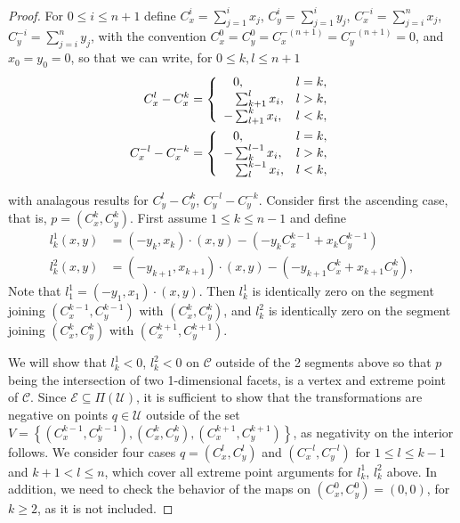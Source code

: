 \documentclass{article}
\theoremstyle{case}
\begin{document}
\begin{proof}
For $0 \leq i \leq n+1$ define $C_x^i = \sum_{j=1}^i x_j$, $C_y^i = \sum_{j=1}^i y_j$, $C_x^{-i} = \sum_{j=i}^n x_j$, $C_y^{-i} = \sum_{j=i}^n y_j$, with the convention $C_x^0 = C_y^0 = C_x^{-(n+1)} = C_y^{-(n+1)} = 0$, and $x_0 = y_0 = 0$, so that we can write, for $0  \leq k,l \leq n+1$
\begin{align*}
C_x^l - C_x^k &= \left\{
\begin{array}{ll}
  \hphantom{-}0, & l = k, \\
  \hphantom{-}\sum_{k+1}^l x_i, & l > k, \\
  -\sum_{l+1}^k x_i, & l < k, \\
\end{array} 
\right. \\
C_x^{-l} - C_x^{-k} &= \left\{
\begin{array}{ll}
  \hphantom{-}0, & l = k, \\
  -\sum_k^{l-1} x_i, & l > k, \\
  \hphantom{-}\sum_l^{k-1} x_i, & l < k, \\
\end{array} 
\right. 
\end{align*}

with analagous results for $C_y^l - C_y^k$, $C_y^{-l} - C_y^{-k}$.
Consider first the ascending case, that is, $p = \left( C_x^k, C_y^k \right)$. First assume $1 \leq k \leq n-1$ and define
\begin{align*}
l_k^1\left( x,y\right) &= \left( -y_k, x_k\right) \cdot \left( x,y\right) - \left( -y_kC_x^{k-1} + x_kC_y^{k-1}\right) \\
l_k^2\left( x,y\right) &= \left( -y_{k+1}, x_{k+1}\right) \cdot \left( x,y\right) - \left( -y_{k+1}C_x^k + x_{k+1}C_y^k\right),
\end{align*}
Note that $l_1^1 = \left( -y_1, x_1\right) \cdot \left( x,y\right)$. Then $l_k^1$ is identically zero on the segment joining $\left( C_x^{k-1}, C_y^{k-1}\right)$ with $\left( C_x^k, C_y^k\right)$, and $l_k^2$ is identically zero on the segment joining $\left( C_x^k, C_y^k\right)$ with $\left( C_x^{k+1}, C_y^{k+1}\right)$. 

We will show that $l_k^1 < 0$, $l_k^2 < 0$ on $\mathcal{C}$ outside of the 2 segments above so that $p$ being the intersection of two 1-dimensional facets, is a vertex and extreme point of $\mathcal{C}$. Since $\mathcal{E} \subseteq \Pi\left( \mathcal{U}\right)$, it is sufficient to show that the transformations are negative on points $q \in \mathcal{U}$ outside of the set  $V = \left\lbrace \left( C_x^{k-1}, C_y^{k-1}\right), \left( C_x^k, C_y^k\right), \left( C_x^{k+1}, C_y^{k+1}\right)\right\rbrace$, as negativity on the interior follows. We consider four cases $q = (C_x^l, C_y^l)$ and $(C_x^{-l}, C_y^{-l})$ for $1 \leq l \leq k-1$ and $k+1 < l \leq n$, which cover all extreme point arguments for $l_k^1$, $l_k^2$ above. In addition, we need to check the behavior of the maps on $(C_x^0, C_y^0) = (0,0)$, for $k \geq 2$, as it is not included. 


\end{proof}
\end{document}
